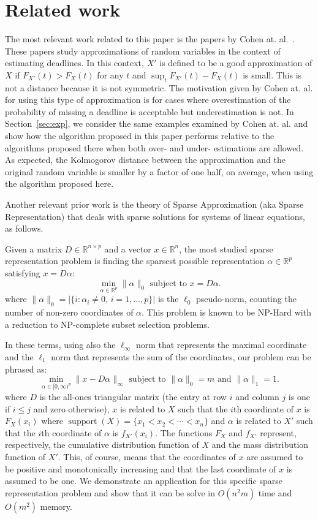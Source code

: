 \documentclass{article}
\DeclareMathOperator{\support}{support}
\begin{document}
	\section{Related work}
	\label{sec:rel-work}
	The most relevant work related to this paper is the papers by Cohen at. al.~\cite{cohen2015estimating,CohenGW18}. These papers study approximations of random variables in the context of estimating deadlines. In this context, $X'$ is defined to be a good approximation of $X$ if $F_{X'}(t) > F_{X}(t)$ for any $t$ and $\sup_t F_{X'}(t) - F_{X}(t)$ is small. This is not a distance because it is not symmetric. The motivation given by Cohen at. al. for using this type of approximation is for cases where overestimation of the probability of missing a deadline is acceptable but underestimation is not. In Section~\ref{sec:exp}, we consider the same examples examined by Cohen at. al. and show how the algorithm proposed in this paper performs relative to the algorithms proposed there when both over- and under- estimations are allowed. As expected, the Kolmogorov distance between the approximation and the original random variable is smaller by a factor of one half, on average, when using the algorithm proposed here. 
	
	
	Another relevant prior work is the theory of Sparse Approximation (aka Sparse Representation) that deals with sparse solutions for systems of linear equations, as follows. 
	
	Given a matrix $D \in \mathbb{R}^{n \times p}$ and a vector $x \in \mathbb{R}^n$, the most studied sparse representation problem is finding the sparsest possible representation $\alpha \in \mathbb{R}^p$ satisfying $x = D\alpha$:
	\[
	\min_{\alpha \in \mathbb{R}^p} \|\alpha\|_0 \text{ subject to } x = D\alpha.
	\]
	where $\|\alpha\|_0 = |\{ i : \alpha_i \neq 0, \, i=1,\ldots,p \}|$ is the $\ell_0$ pseudo-norm, counting the number of non-zero coordinates of $\alpha$. This problem is known to be NP-Hard with a reduction to NP-complete subset selection problems.
	
	In these terms, using also the $\ell_\infty$ norm that represents the maximal coordinate and the $\ell_1$ norm that represents the sum of the coordinates, our problem can be phrased as:
	\[
	\min_{\alpha \in [0,\infty)^p}\|x - D\alpha\|_{\infty} \text{ subject to }  \|\alpha\|_0 = m \text{ and } \|\alpha\|_1=1.
	\]
	where $D$ is the all-ones triangular matrix (the entry at row $i$ and column $j$ is one if $i\leq j$ and zero otherwise), $x$ is related to $X$ such that the $i$th coordinate of $x$ is $F_X(x_i)$ where $\support(X)=\{x_1 < x_2 < \cdots < x_n\}$ and $\alpha$ is related to $X'$ such that the $i$th coordinate of $\alpha$ is $f_{X'}(x_i)$. The functions $F_X$ and $f_{X'}$ represent, respectively, the cumulative distribution function of $X$ and the mass distribution function of $X'$. This, of course, means that the coordinates of $x$ are assumed to be positive and monotonically increasing and that the last coordinate of $x$ is assumed to be one. We demonstrate an application for this specific sparse representation problem and show that it can be solve in $O(n^2m)$ time and $O(m^2)$ memory.
	
\end{document}
